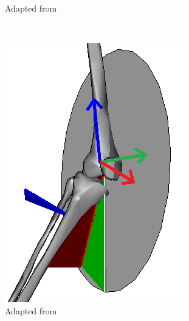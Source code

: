 \documentclass[../main.tex]{subfiles}
\begin{document}
\begin{figure}[!htb]
\begin{subfigure}[t]{0.3\textwidth}
        \caption{Adapted from \cite{Baker2017}}
        \label{fig:cgm23-femur-jc}
    \end{subfigure}
     ~
    \begin{subfigure}[t]{0.3\textwidth}
        \centering
        \includegraphics[width=\textwidth]{img/KneeJointAngles_wCoord_twisted.png}
        \caption{Adapted from \cite{cgm-outputs}}
        \label{fig:cgm23-knee-coordinate-system}
    \end{subfigure}
     ~
    \begin{subfigure}[t]{0.3\textwidth}
        \centering

\end{subfigure}
\end{figure}
\end{document}
